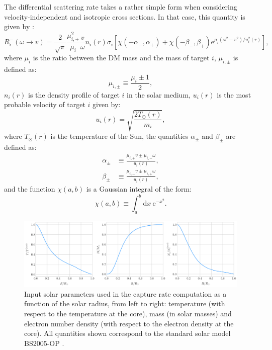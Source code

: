 The differential scattering rate takes a rather simple form when considering velocity-independent and isotropic cross sections. In that case, this quantity is given by \cite{Gould1987, Palomares2017}:
\begin{equation}\label{2.6}
	R_{i}^{-}(\omega \rightarrow v) = \frac{2}{\sqrt{\pi}} \frac{\mu_{i,+}^{2}}{\mu_{i}} \frac{v}{\omega} n_{i}(r) \sigma_{i} \left[\chi(- \alpha_{-}, \alpha_{+})+\chi(- \beta_{-}, \beta_{+}) \mathrm{e}^{\mu_{i}(\omega^{2}-v^{2})/u_{i}^{2}(r)}\right],
\end{equation}
where $\mu_{i}$ is the ratio between the DM mass and the mass of target $i$, $\mu_{i,\pm}$ is defined as:
\begin{equation}\label{2.7}
	\mu_{i,\pm} \equiv \frac{\mu_{i} \pm 1}{2},
\end{equation}
$n_{i}(r)$ is the density profile of target $i$ in the solar medium, $u_{i}(r)$ is the most probable velocity of target $i$ given by:
\begin{equation}\label{2.8}
	u_{i}(r) = \sqrt{\frac{2 T_{\odot}(r)}{m_{i}}},
\end{equation}
where $T_{\odot}(r)$ is the temperature of the Sun, the quantities $\alpha_{\pm}$ and $\beta_{\pm}$ are defined as:
\begin{align}\label{2.9-2.10}
	\alpha_{\pm} &\equiv \frac{\mu_{i,+} v \pm \mu_{i,-} \omega}{u_{i}(r)},\\
	\beta_{\pm} &\equiv \frac{\mu_{i,-} v \pm \mu_{i,+} \omega}{u_{i}(r)},
\end{align}
and the function $\chi(a,b)$ is a Gaussian integral of the form:
\begin{equation}\label{2.11}
	\chi(a,b) \equiv \int_{a}^{b} \mathrm{d}x \ \mathrm{e}^{-x^{2}}. 
\end{equation}

\begin{figure}[t]
	\centering
	\includegraphics[width=1\linewidth]{Images/DM_Analysis/ssm_params.pdf}
	\caption[Input solar parameters used in the capture rate computation as a function of the solar radius.]{Input solar parameters used in the capture rate computation as a function of the solar radius, from left to right: temperature (with respect to the temperature at the core), mass (in solar masses) and electron number density (with respect to the electron density at the core). All quantities shown correspond to the standard solar model BS2005-OP \cite{Bahcall2004}.}
	\label{fig:ssm_params}
\end{figure}

